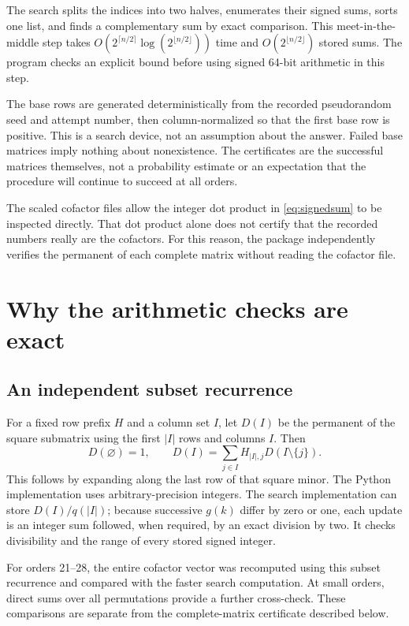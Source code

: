 \documentclass[11pt,a4paper]{article}
\theoremstyle{remark}\newtheorem{remark}[theorem]{Remark}
\begin{document}
The search splits the indices into two halves, enumerates their signed sums, sorts one list, and finds a complementary sum by exact comparison. This meet-in-the-middle step takes $O(2^{\lceil n/2\rceil}\log(2^{\lfloor n/2\rfloor}))$ time and $O(2^{\lfloor n/2\rfloor})$ stored sums. The program checks an explicit bound before using signed 64-bit arithmetic in this step.

The base rows are generated deterministically from the recorded pseudorandom seed and attempt number, then column-normalized so that the first base row is positive. This is a search device, not an assumption about the answer. Failed base matrices imply nothing about nonexistence. The certificates are the successful matrices themselves, not a probability estimate or an expectation that the procedure will continue to succeed at all orders.

The scaled cofactor files allow the integer dot product in \eqref{eq:signedsum} to be inspected directly. That dot product alone does not certify that the recorded numbers really are the cofactors. For this reason, the package independently verifies the permanent of each complete matrix without reading the cofactor file.

\section{Why the arithmetic checks are exact}
\subsection{An independent subset recurrence}
For a fixed row prefix $H$ and a column set $I$, let $D(I)$ be the permanent of the square submatrix using the first $|I|$ rows and columns $I$. Then
\begin{equation}\label{eq:dp}
 D(\varnothing)=1,\qquad
 D(I)=\sum_{j\in I}H_{|I|,j}D(I\setminus\{j\}).
\end{equation}
This follows by expanding along the last row of that square minor. The Python implementation uses arbitrary-precision integers. The search implementation can store $D(I)/q(|I|)$; because successive $g(k)$ differ by zero or one, each update is an integer sum followed, when required, by an exact division by two. It checks divisibility and the range of every stored signed integer.

For orders 21--28, the entire cofactor vector was recomputed using this subset recurrence and compared with the faster search computation. At small orders, direct sums over all permutations provide a further cross-check. These comparisons are separate from the complete-matrix certificate described below.
\end{document}
